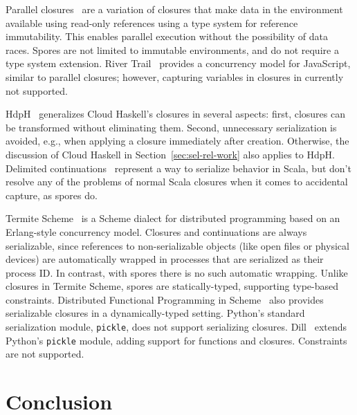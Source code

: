 \documentclass{llncs}
\begin{document}
Parallel closures~\cite{ParallelClosures} are a variation of closures that make data in the environment available using read-only references using a type system for reference immutability. This enables parallel execution without the possibility of data races. Spores are not limited to immutable environments, and do not require a type system extension. River Trail~\cite{HerhutHSS13} provides a concurrency model for JavaScript, similar to parallel closures; however, capturing variables in closures in currently not supported.

HdpH~\cite{HDPH} generalizes Cloud Haskell's closures in several aspects: first, closures can be transformed without eliminating them. Second, unnecessary serialization is avoided, e.g., when applying a closure immediately after creation. Otherwise, the discussion of Cloud Haskell in Section~\ref{sec:sel-rel-work} also applies to HdpH. Delimited continuations~\cite{DelimitedContinuations} represent a way to serialize behavior in Scala, but don't resolve any of the problems of normal Scala closures when it comes to accidental capture, as spores do.

Termite Scheme~\cite{Termite} is a Scheme dialect for distributed programming based on an Erlang-style concurrency model. Closures and continuations are always serializable, since references to non-serializable objects (like open files or physical devices) are automatically wrapped in processes that are serialized as their process ID. In contrast, with spores there is no such automatic wrapping. Unlike closures in Termite Scheme, spores are statically-typed, supporting type-based constraints. Distributed Functional Programming in Scheme~\cite{DFPS} also provides serializable closures in a dynamically-typed setting. Python's standard serialization module, \verb|pickle|, does not support serializing closures. Dill~\cite{dill} extends Python's \verb|pickle| module, adding support for functions and closures. Constraints are not supported.








\section{Conclusion}
\label{sec:conclusion}
\end{document}
